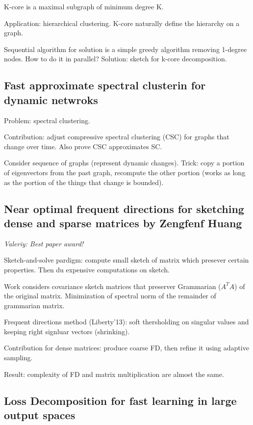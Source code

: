 \documentclass[11pt,oneside,a4paper]{scrartcl}
\newcommand{\valeriy}[1]{{\color{blue}\textit{Valeriy: #1}}}
\begin{document}
K-core is a maximal subgraph of minimum degree K.

Application: hierarchical clustering. K-core naturally define the
hierarchy on a graph.

Sequential algorithm for solution is a simple greedy algorithm
removing 1-degree nodes. How to do it in parallel?
Solution: sketch for k-core decomposition.


\subsection{Fast approximate spectral clusterin for dynamic netwroks}
\label{sec:fast-appr-spectr}

Problem: spectral clustering.

Contribution: adjust compressive spectral clustering (CSC) for graphs that
change over time. Also prove CSC approximates SC.

Consider sequence of graphs (represent dynamic changes). Trick: copy a
portion of eigenvectors from the past graph, recompute the other
portion (works as long as the portion of the things that change is
bounded).



\subsection{Near optimal frequent directions for sketching dense and
  sparse matrices by Zengfenf Huang \cite{huang18a}}
\label{sec:near-optim-freq}

\valeriy{Best paper award!}

Sketch-and-solve pardigm: compute small sketch of matrix which
presever certain properties. Then du expensive computations on sketch.

Work considers covariance sketch matrices that preserver Grammarian
($A^TA$) of the original matrix. Minimization of spectral norm of the
remainder of grammarian matrix.

Frequent directions method (Liberty'13): soft thersholding on singular
values and keeping right signluar vectors (shrinking).

Contribution for dense matrices: produce coarse FD, then refine it using adaptive
sampling.

Result: complexity of FD and matrix multiplication are almost the same.


\subsection{Loss Decomposition for fast learning in large output
   spaces \cite{yen18a}}
\label{sec:loss-decomp-fast}
\end{document}
